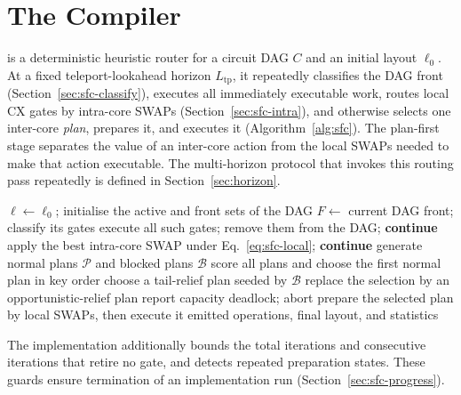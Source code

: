 \section{The \PORTER{} Compiler}
\label{sec:sfc}

\PORTER{} is a deterministic heuristic router for a circuit DAG $C$ and
an initial layout $\ell_0$.  At a fixed teleport-lookahead horizon
$L_\mathrm{tp}$, it repeatedly classifies the DAG front
(Section~\ref{sec:sfc-classify}), executes all immediately executable work,
routes local CX gates by intra-core SWAPs (Section~\ref{sec:sfc-intra}), and
otherwise selects one inter-core \emph{plan}, prepares it, and executes it
(Algorithm~\ref{alg:sfc}).  The plan-first stage
separates the value of an inter-core action from the local SWAPs needed to
make that action executable.  The multi-horizon protocol that invokes this
routing pass repeatedly is defined in Section~\ref{sec:horizon}.

\begin{algorithm}[t]
\caption{\PORTER{} \texttt{compile}$(C,\ell_0)$}
\label{alg:sfc}
\begin{algorithmic}[1]
\STATE $\ell\leftarrow\ell_0$; initialise the active and front sets of the DAG
\STATE $F\leftarrow$ current DAG front; classify its gates
  \STATE execute all such gates; remove them from the DAG; \textbf{continue}
\ENDIF
{}
  \STATE apply the best intra-core SWAP under Eq.~\ref{eq:sfc-local}; \textbf{continue}
\ENDIF
\STATE generate normal plans $\mathcal P$ and blocked plans $\mathcal B$
\STATE score all plans and choose the first normal plan in key order
  \STATE choose a tail-relief plan seeded by $\mathcal B$
  \STATE replace the selection by an opportunistic-relief plan
\ENDIF
{} \STATE report capacity deadlock; abort \ENDIF
\STATE prepare the selected plan by local SWAPs, then execute it
\ENDWHILE
\RETURN emitted operations, final layout, and statistics
\end{algorithmic}
\end{algorithm}

The implementation additionally bounds the total iterations and consecutive
iterations that retire no gate, and detects repeated preparation states.  These
guards ensure termination of an implementation run (Section~\ref{sec:sfc-progress}).

